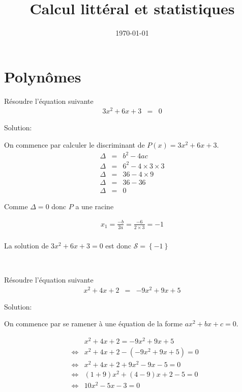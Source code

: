 \documentclass[a4paper,10pt]{article}
\title{Calcul littéral et statistiques}
\date{\today}
\begin{document}
\maketitle


\section{Polynômes}



    
    Résoudre l'équation suivante
    \begin{eqnarray*}
        3 x^{  2 } + 6 x + 3 & = & 0
    \end{eqnarray*}

    Solution:

    

    On commence par calculer le discriminant de $P(x) = 3 x^{  2 } + 6 x + 3$.
    \begin{eqnarray*}
        \Delta & = & b^2-4ac \\
        \Delta & = & 6^{  2 } - 4 \times 3 \times 3 \\ 
\Delta & = & 36 - 4 \times 9 \\ 
\Delta & = & 36 - 36 \\ 
\Delta & = & 0
    \end{eqnarray*}

    
    Comme $\Delta = 0$ donc $P$ a une racine

    \begin{eqnarray*}
        x_1 = \frac{-b}{2a} = \frac{-6}{2\times 3} = -1 \\
    \end{eqnarray*}

    La solution de $3 x^{  2 } + 6 x + 3 = 0$ est donc $\mathcal{S} = \left\{ -1\right\}$

    



    \bigskip
    ~\dotfill
    \bigskip
    
    
    
    
    Résoudre l'équation suivante
    \begin{eqnarray*}
        x^{  2 } + 4 x + 2 & = & - 9 x^{  2 } + 9 x + 5
    \end{eqnarray*}

    Solution:

    On commence par se ramener à une équation de la forme $ax^2+bx+c = 0$.

    

    \begin{align*}
         & & x^{  2 } + 4 x + 2 = - 9 x^{  2 } + 9 x + 5 \\
         & \Leftrightarrow & x^{  2 } + 4 x + 2 - ( - 9 x^{  2 } + 9 x + 5 )= 0 \\ 
 & \Leftrightarrow & x^{  2 } + 4 x + 2 + 9 x^{  2 } - 9 x - 5= 0 \\ 
 & \Leftrightarrow & ( 1 + 9 ) x^{  2 } + ( 4 - 9 ) x + 2 - 5= 0 \\ 
 & \Leftrightarrow & 10 x^{  2 } - 5 x - 3= 0
    \end{align*}
\end{document}
